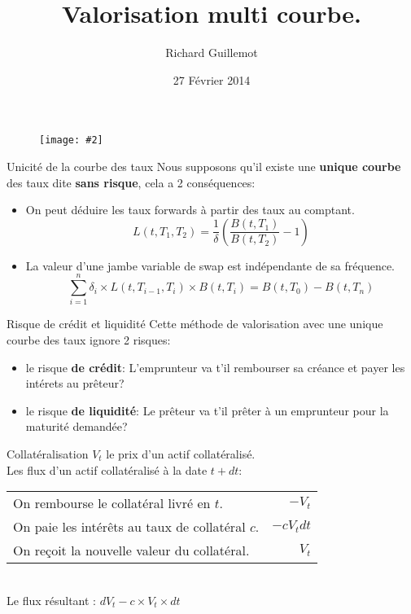 \documentclass{beamer}
\title[Produits dérivés de taux]{Valorisation multi courbe. }
\author{Richard Guillemot}
\institute{Master IFMA}
\date{27 Février 2014}
\newcommand{\FIG}[2]{\texttt{[image: \#2]}}
\begin{document}
\begin{frame}
\titlepage
\begin{figure}[h]
\centering \FIG{5cm}{figures/UPMC_IFMA.jpg}
\end{figure}
\end{frame}

\begin{frame}{Unicité de la courbe des taux}
Nous supposons qu'il existe une \textbf{unique courbe} des taux dite \textbf{sans risque}, cela a 2 conséquences:
\begin{itemize}
\item On peut déduire les taux forwards à partir des taux au comptant.
\[
L(t,T_1, T_2)=\frac{1}{\delta}\left(\frac{B(t,T_1)}{B(t,T_2)}-1\right)
\]
\item La valeur d'une jambe variable de swap est indépendante de sa fréquence.
\[
\sum_{i=1}^{n}\delta_i \times L(t,T_{i-1}, T_i) \times  B(t,T_i)=B(t,T_0)-B(t,T_n)
\]
\end{itemize}
\end{frame}

\begin{frame}{Risque de crédit et liquidité}
Cette méthode de valorisation avec une unique courbe des taux ignore 2 risques:
\begin{itemize}
\item le risque \textbf{de crédit}: L'emprunteur va t'il rembourser sa créance et payer les intérets au prêteur?
\item le risque \textbf{de liquidité}: Le prêteur va t'il prêter à un emprunteur pour la maturité demandée?
\end{itemize}
\end{frame}

\begin{frame}{Collatéralisation}
$V_t$ le prix d'un actif collatéralisé.\\
\vspace{0.5cm}
Les flux d'un actif collatéralisé à la date $t+dt$:\\
\vspace{0.5cm}
\begin{tabular}{l|r}
On rembourse le collatéral livré en $t$. & $-V_t$ \\
On paie les intérêts au taux de collatéral $c$.& $-c V_t dt$\\
On reçoit la nouvelle valeur du collatéral.& $V_t$ \\
\end{tabular}
\vspace{0.5cm}\\
Le flux résultant : $dV_t - c \times V_t \times dt$
\end{frame}
\end{document}
